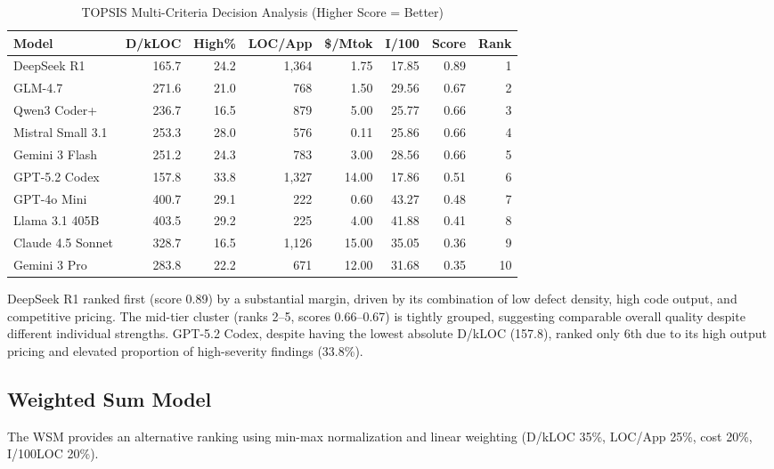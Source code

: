 \begin{table}[htbp]
    \centering
    \caption{TOPSIS Multi-Criteria Decision Analysis (Higher Score = Better)}
    \label{tab:topsis}
    \small
    \begin{tabular}{@{} l r r r r r r r @{}}
        \toprule
        \textbf{Model} & \textbf{D/kLOC} & \textbf{High\%} & \textbf{LOC/App} & \textbf{\$/Mtok} & \textbf{I/100} & \textbf{Score} & \textbf{Rank} \\
        \midrule
        DeepSeek R1 & 165.7 & 24.2 & 1{,}364 & 1.75 & 17.85 & 0.89 & 1 \\
        GLM-4.7 & 271.6 & 21.0 & 768 & 1.50 & 29.56 & 0.67 & 2 \\
        Qwen3 Coder+ & 236.7 & 16.5 & 879 & 5.00 & 25.77 & 0.66 & 3 \\
        Mistral Small 3.1 & 253.3 & 28.0 & 576 & 0.11 & 25.86 & 0.66 & 4 \\
        Gemini 3 Flash & 251.2 & 24.3 & 783 & 3.00 & 28.56 & 0.66 & 5 \\
        GPT-5.2 Codex & 157.8 & 33.8 & 1{,}327 & 14.00 & 17.86 & 0.51 & 6 \\
        GPT-4o Mini & 400.7 & 29.1 & 222 & 0.60 & 43.27 & 0.48 & 7 \\
        Llama 3.1 405B & 403.5 & 29.2 & 225 & 4.00 & 41.88 & 0.41 & 8 \\
        Claude 4.5 Sonnet & 328.7 & 16.5 & 1{,}126 & 15.00 & 35.05 & 0.36 & 9 \\
        Gemini 3 Pro & 283.8 & 22.2 & 671 & 12.00 & 31.68 & 0.35 & 10 \\
        \bottomrule
    \end{tabular}
\end{table}

DeepSeek R1 ranked first (score 0.89) by a substantial margin, driven by its combination of low defect density, high code output, and competitive pricing. The mid-tier cluster (ranks 2--5, scores 0.66--0.67) is tightly grouped, suggesting comparable overall quality despite different individual strengths. GPT-5.2 Codex, despite having the lowest absolute D/kLOC (157.8), ranked only 6th due to its high output pricing and elevated proportion of high-severity findings (33.8\%).

\subsection{Weighted Sum Model}

The WSM provides an alternative ranking using min-max normalization and linear weighting (D/kLOC 35\%, LOC/App 25\%, cost 20\%, I/100LOC 20\%).

